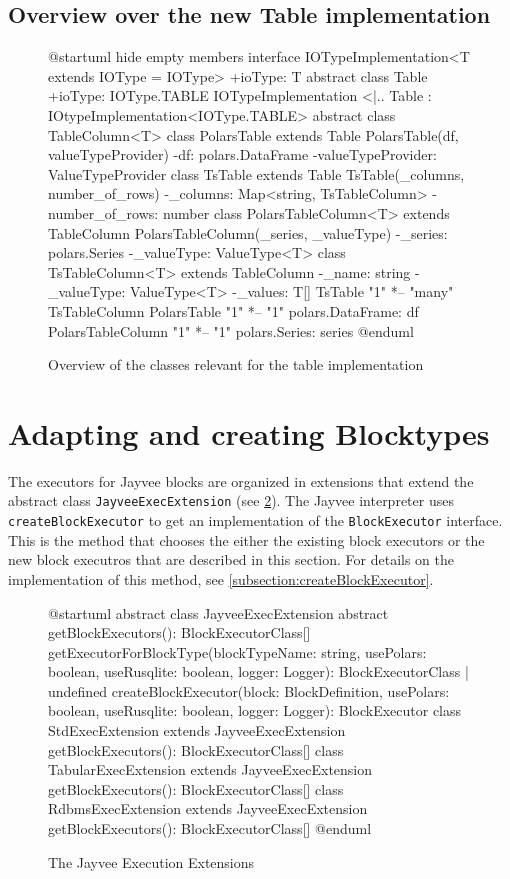 \subsection{Overview over the new Table implementation}
\begin{figure}[h]
	\begin{plantuml}
		@startuml
		hide empty members
		interface IOTypeImplementation<T extends IOType = IOType> {
				+ioType: T
			}
		abstract class Table {
				+ioType: IOType.TABLE
			}
		IOTypeImplementation <|.. Table : IOtypeImplementation<IOType.TABLE>
		abstract class TableColumn<T> {
			}
		class PolarsTable extends Table {
				PolarsTable(df, valueTypeProvider)
				-df: polars.DataFrame
				-valueTypeProvider: ValueTypeProvider
			}
		class TsTable extends Table {
				TsTable(_columns, number_of_rows)
				-_columns: Map<string, TsTableColumn>
				-number_of_rows: number
			}
		class PolarsTableColumn<T> extends TableColumn {
				PolarsTableColumn(_series, _valueType)
				-_series: polars.Series
				-_valueType: ValueType<T>
			}
		class TsTableColumn<T> extends TableColumn {
				-_name: string
				-_valueType: ValueType<T>
				-_values: T[]
			}
		TsTable "1" *-- "many" TsTableColumn
		PolarsTable "1" *-- "1" polars.DataFrame: df
		PolarsTableColumn "1" *-- "1" polars.Series: series
		@enduml
	\end{plantuml}
	\caption{Overview of the classes relevant for the table implementation} %
	\label{fig:current_sit}
\end{figure}

\section{Adapting and creating Blocktypes}
The executors for Jayvee blocks are organized in extensions that extend the abstract class \Verb|JayveeExecExtension| (see \ref{fig:uml:jayveeexecextension}).
The Jayvee interpreter uses \Verb|createBlockExecutor| to get an implementation of the \Verb|BlockExecutor| interface.
This is the method that chooses the either the existing block executors or the new block executros that are described in this section.
For details on the implementation of this method, see \ref{subsection:createBlockExecutor}.

\begin{figure}
	\begin{plantuml}
		@startuml
		abstract class JayveeExecExtension {
				{abstract} getBlockExecutors(): BlockExecutorClass[]
				getExecutorForBlockType(blockTypeName: string, usePolars: boolean, useRusqlite: boolean, logger: Logger): BlockExecutorClass | undefined
				createBlockExecutor(block: BlockDefinition, usePolars: boolean, useRusqlite: boolean, logger: Logger): BlockExecutor
			}
		class StdExecExtension extends JayveeExecExtension {
				getBlockExecutors(): BlockExecutorClass[]
			}
		class TabularExecExtension extends JayveeExecExtension {
				getBlockExecutors(): BlockExecutorClass[]
			}
		class RdbmsExecExtension extends JayveeExecExtension {
				getBlockExecutors(): BlockExecutorClass[]
			}
		@enduml
	\end{plantuml}
	\caption{The Jayvee Execution Extensions} %
	\label{fig:uml:jayveeexecextension}
\end{figure}

